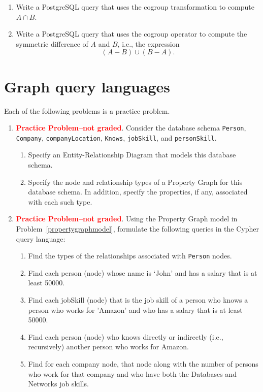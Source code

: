 \documentclass{article}
\begin{document}
\begin{enumerate}[resume]
\begin{enumerate}
\item Write a PostgreSQL query that uses the cogroup transformation
to compute $A \cap B$.

\item Write a PostgreSQL query that uses the cogroup operator
to compute the symmetric difference of $A$ and $B$, i.e., the expression
$$(A - B) \cup (B-A).$$
\end{enumerate}
\end{enumerate}


\newpage
\section{Graph query languages}

Each of the following problems is a practice problem.

\begin{enumerate}[resume]
\item \textcolor{red}{\bf Practice Problem--not graded}.  Consider the database schema 
{\tt Person}, {\tt Company}, {\tt companyLocation}, {\tt Knows}, {\tt jobSkill}, and {\tt personSkill}.
\begin{enumerate}
\item Specify  an  Entity-Relationship  Diagram  that  models  this  database schema.
\item\label{propertygraphmodel} Specify  the  node  and  relationship  types  of  a  Property  Graph  for this  database  schema.   In  addition,  specify  the  properties,  if  any, associated with each such type.
\end{enumerate}

\item 
\textcolor{red}{\bf Practice Problem--not graded}.
Using the Property Graph model in Problem~\ref{propertygraphmodel},
formulate the following queries in the Cypher query language:
\begin{enumerate}
\item Find the types of the relationships associated with {\tt Person} nodes.
\item Find each person (node) whose name is ‘John’ and has a salary that is at least 50000.
\item Find each jobSkill (node) that is the job skill of a person who knows 
a person who works for 'Amazon' and who has a salary that is at least 50000.
\item Find each person (node) who knows directly or indirectly (i.e., recursively) another person who works for Amazon.
\item Find for each company node, that node along with the number of persons who work for that company
and who have both the Databases and Networks job skills.
\end{enumerate}

\end{enumerate}
\end{document}
